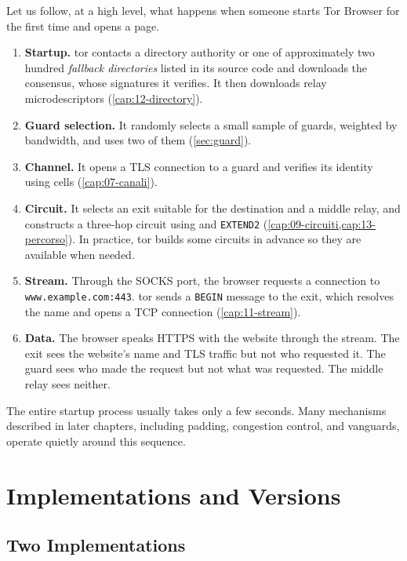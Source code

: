 Let us follow, at a high level, what happens when someone starts Tor Browser for the first time and opens a page.
\begin{enumerate}
  \item \textbf{Startup.} tor contacts a directory authority or one of approximately two hundred \emph{fallback directories} listed in its source code and downloads the consensus, whose signatures it verifies. It then downloads relay microdescriptors (\cref{cap:12-directory}).
  \item \textbf{Guard selection.} It randomly selects a small sample of guards, weighted by bandwidth, and uses two of them (\cref{sec:guard}).
  \item \textbf{Channel.} It opens a TLS connection to a guard and verifies its identity using  cells (\cref{cap:07-canali}).
  \item \textbf{Circuit.} It selects an exit suitable for the destination and a middle relay, and constructs a three-hop circuit using  and \texttt{EXTEND2} (\cref{cap:09-circuiti,cap:13-percorso}). In practice, tor builds some circuits in advance so they are available when needed.
  \item \textbf{Stream.} Through the SOCKS port, the browser requests a connection to \texttt{www.example.com:443}. tor sends a \texttt{BEGIN} message to the exit, which resolves the name and opens a TCP connection (\cref{cap:11-stream}).
  \item \textbf{Data.} The browser speaks HTTPS with the website through the stream. The exit sees the website's name and TLS traffic but not who requested it. The guard sees who made the request but not what was requested. The middle relay sees neither.
\end{enumerate}
The entire startup process usually takes only a few seconds. Many mechanisms described in later chapters, including padding, congestion control, and vanguards, operate quietly around this sequence.

\section{Implementations and Versions}\label{sec:arch-versioni}

\subsection{Two Implementations}

